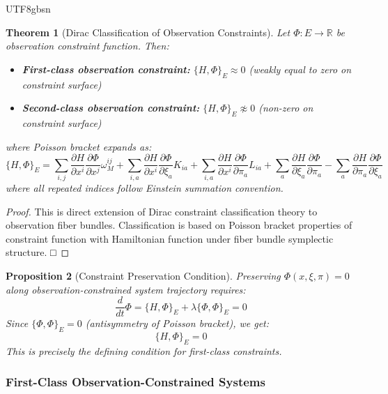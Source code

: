 \documentclass[a4paper,12pt]{extarticle}
\newtheorem{theorem}{Theorem}
\newtheorem{proposition}[theorem]{Proposition}
\theoremstyle{definition}
\begin{document}
\begin{CJK}{UTF8}{gbsn}
\begin{theorem}[Dirac Classification of Observation Constraints]
Let $\Phi: E \to \mathbb{R}$ be observation constraint function. Then:
\begin{itemize}
\item \textbf{First-class observation constraint:} $\{H, \Phi\}_E \approx 0$ (weakly equal to zero on constraint surface)
\item \textbf{Second-class observation constraint:} $\{H, \Phi\}_E \not\approx 0$ (non-zero on constraint surface)
\end{itemize}
where Poisson bracket expands as:
$$\{H, \Phi\}_E = \sum_{i,j} \frac{\partial H}{\partial x^i}\frac{\partial \Phi}{\partial x^j}\omega_M^{ij} + \sum_{i,a} \frac{\partial H}{\partial x^i}\frac{\partial \Phi}{\partial \xi_a}K_{ia} + \sum_{i,a} \frac{\partial H}{\partial x^i}\frac{\partial \Phi}{\partial \pi_a}L_{ia} + \sum_a \frac{\partial H}{\partial \xi_a}\frac{\partial \Phi}{\partial \pi_a} - \sum_a \frac{\partial H}{\partial \pi_a}\frac{\partial \Phi}{\partial \xi_a}$$
where all repeated indices follow Einstein summation convention.
\end{theorem}

\begin{proof}
This is direct extension of Dirac constraint classification theory to observation fiber bundles. Classification is based on Poisson bracket properties of constraint function with Hamiltonian function under fiber bundle symplectic structure. □
\end{proof}

\begin{proposition}[Constraint Preservation Condition]
Preserving $\Phi(x,\xi,\pi)=0$ along observation-constrained system trajectory requires:
$$\frac{d}{dt}\Phi = \{H,\Phi\}_E + \lambda\{\Phi,\Phi\}_E = 0$$
Since $\{\Phi,\Phi\}_E = 0$ (antisymmetry of Poisson bracket), we get:
$$\{H,\Phi\}_E = 0$$
This is precisely the defining condition for first-class constraints.
\end{proposition}

\subsubsection{First-Class Observation-Constrained Systems}


\end{CJK}
\end{document}
